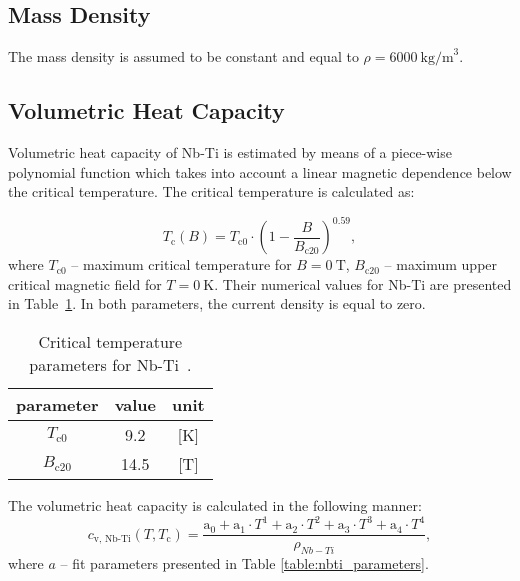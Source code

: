 
\subsection{Mass Density}
The mass density is assumed to be constant and equal to $\rho = 6000~\text{kg/m}^{3}$.

\subsection{Volumetric Heat Capacity}
Volumetric heat capacity of Nb-Ti is estimated by means of a piece-wise polynomial function which takes into account a linear magnetic dependence below the critical temperature. The critical temperature is calculated as: 

\begin{equation}
    T_\text{c}(B) = T_\text{c0}\cdot(1-\frac{B}{B_\text{c20}})^{0.59},
    \label{eqn:critical_temperature_appendix}
\end{equation}
where $T_\text{c0}$ -- maximum critical temperature for $B=0~\text{T}$, $B_\text{c20}$ -- maximum upper critical magnetic field for $T=0~\text{K}$. Their numerical values for Nb-Ti are presented in Table~\ref{table: appendix_nb_ti_crit_temp_params}. In both parameters, the current density is equal to zero. 

\begin{table}[H]
    \caption{Critical temperature parameters for Nb-Ti~\cite{empirical_scaling_formulas_for_critical_current}.} 
    \vspace{-1.em} 
    \fontsize{10}{10}
    \selectfont 
    \renewcommand{\arraystretch}{1.5}
    \begin{center}
        \begin{tabular}{ ccc }  
        \hline
        parameter & value & unit \\
        \hline
        $T_\text{c0}$ & 9.2 & [K] \\
        $B_\text{c20}$ & 14.5 & [T] \\
        \hline 
        \end{tabular}
    \end{center}  
     \label{table: appendix_nb_ti_crit_temp_params} 
 \end{table}

The volumetric heat capacity is calculated in the following manner: 
\begin{equation}
    c_\text{v, Nb-Ti}(T, T_\text{c}) = \frac{\text{a}_0 + \text{a}_1\cdot T^{1} + \text{a}_2\cdot T^{2} + \text{a}_3\cdot T^{3}+ \text{a}_4\cdot T^{4}} {\rho_{Nb-Ti}},
\end{equation}
where $a$ -- fit parameters presented in Table \ref{table:nbti_parameters}.

